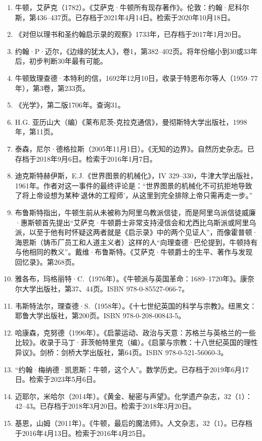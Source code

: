 \begin{enumerate}
\item 牛顿，艾萨克（1782）。《艾萨克·牛顿所有现存著作》。伦敦：约翰·尼科尔斯，第436–437页。已存档于2021年4月14日。检索于2020年10月18日。  
\item 《对但以理书和圣约翰启示录的观察》1733年，已存档于2017年1月20日。  
\item 约翰·P·迈尔，《边缘的犹太人》，卷1，第382–402页。将年份缩小到30或33年后，初步判断30年最有可能。  
\item 牛顿致理查德·本特利的信，1692年12月10日，收录于特恩布尔等人（1959–77年），第3卷，第233页。  
\item 《光学》，第二版1706年。查询31。
\item  H.G. 亚历山大（编）《莱布尼茨-克拉克通信》，曼彻斯特大学出版社，1998年，第11页。  
\item  泰森，尼尔·德格拉斯（2005年11月1日）。《无知的边界》。自然历史杂志。已存档于2018年9月6日。检索于2016年1月7日。  
\item  迪克斯特赫伊斯，E.J.《世界图景的机械化》，IV 329–330，牛津大学出版社，1961年。作者对这一事件的最终评论是：“世界图景的机械化不可抗拒地导致了将上帝设想为某种‘退休的工程师’，从这里到完全排除上帝只需再走一步。”  
\item  布鲁斯特指出，牛顿生前从未被称为阿里乌教派信徒，而是阿里乌派信徒威廉·惠斯顿首先提出“艾萨克·牛顿爵士非常支持浸信会和尤西比乌斯派或阿里乌派，以至于他有时怀疑这两者就是《启示录》中的两个见证人”，而像霍普顿·海恩斯（铸币厂员工和人道主义者）这样的人“向理查德·巴伦提到，牛顿持有与他相同的教义”。戴维·布鲁斯特。《艾萨克·牛顿爵士的生平、著作与发现回忆录》。第268页。 
\item 雅各布，玛格丽特·C.（1976年）。《牛顿派与英国革命：1689–1720年》。康奈尔大学出版社，第37、44页。ISBN 978-0-85527-066-7。  
\item 韦斯特法尔，理查德·S.（1958年）。《十七世纪英国的科学与宗教》。纽黑文：耶鲁大学出版社，第200页。ISBN 978-0-208-00843-5。  
\item 哈康森，克努德（1996年）。《启蒙运动、政治与天意：苏格兰与英格兰的一些比较》。收录于马丁·菲茨帕特里克（编）。《启蒙与宗教：十八世纪英国的理性异议》。剑桥：剑桥大学出版社，第64页。ISBN 978-0-521-56060-3。  
\item “约翰·梅纳德·凯恩斯：牛顿，这个人”。数学历史。已存档于2019年6月17日。检索于2023年5月6日。  
\item 迈耶尔，米哈尔（2014年）。《黄金、秘密与声望》。化学遗产杂志，32（1）：42–43。已存档于2018年3月20日。检索于2018年3月20日。
\item 基恩，山姆（2011年）。《牛顿，最后的魔法师》。人文杂志，32（1）。已存档于2016年4月13日。检索于2016年4月25日。  

\end{enumerate}

